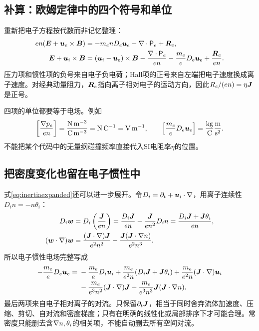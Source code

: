 \subsection{补算：欧姆定律中的四个符号和单位}
重新把电子方程按代数而非记忆整理：
\begin{align}
 en(\bm{E}+\bm{u}_e\times\bm{B})
 &=-m_enD_e\bm{u}_e-\nabla\cdot\mathsf P_e+\bm{R}_e,\\
 \bm{E}+\bm{u}_i\times\bm{B}
 &=(\bm{u}_i-\bm{u}_e)\times\bm{B}
   -{\nabla\cdot\mathsf P_e\over en}-{m_e\over e}D_e\bm{u}_e
   +{\bm{R}_e\over en}.
\end{align}
压力项和惯性项的负号来自电子负电荷；Hall项的正号来自左端把电子速度换成离子速度。对经典动量阻力，$\bm{R}_e$指向离子相对电子的运动方向，因此$R_e/(en)=\eta\bm{J}$是正号。

四项的单位都要等于电场。例如
\begin{equation}
 \left[{\nabla p_e\over en}\right]
 ={{\rm N\,m^{-3}}\over{\rm C\,m^{-3}}}
 ={\rm N\,C^{-1}}={\rm V\,m^{-1}},\qquad
 \left[{m_e\over e}D_e\bm{u}_e\right]
 ={{\rm kg}\over{\rm C}}{{\rm m}\over{\rm s^2}}.
\end{equation}
不能把某个代码中的无量纲碰撞频率直接代入SI电阻率$\eta$的位置。

\subsection{把密度变化也留在电子惯性中}
式\eqref{eq:inertiaexpanded}还可以进一步展开。令$D_i=\partial_t+\bm{u}_i\cdot\nabla$，用离子连续性$D_in=-n\theta_i$：
\begin{align}
 D_i\bm{w}&=D_i\left({\bm{J}\over en}\right)
 ={D_i\bm{J}\over en}-{\bm{J}\over en^2}D_in
 ={D_i\bm{J}+\bm{J}\theta_i\over en},\\
 (\bm{w}\cdot\nabla)\bm{w}
 &={(\bm{J}\cdot\nabla)\bm{J}\over e^2n^2}
 -{\bm{J}(\bm{J}\cdot\nabla n)\over e^2n^3}.
\end{align}
所以电子惯性电场完整写成
\begin{align}
 -{m_e\over e}D_e\bm{u}_e
 ={}&-{m_e\over e}D_i\bm{u}_i
 +{m_e\over e^2n}(D_i\bm{J}+\bm{J}\theta_i)
 +{m_e\over e^2n}(\bm{J}\cdot\nabla)\bm{u}_i\\
 &-{m_e\over e^3n^2}(\bm{J}\cdot\nabla)\bm{J}
 +{m_e\over e^3n^3}\bm{J}(\bm{J}\cdot\nabla n).\nonumber
\end{align}
最后两项来自电子相对离子的对流。只保留$\partial_t\bm{J}$，相当于同时舍弃流体加速度、压缩、剪切、自对流和密度梯度；只有在明确的线性化或局部排序下才可能合理。常密度只能删去含$\nabla n,\theta_i$的相关项，不能自动删去所有空间对流。

